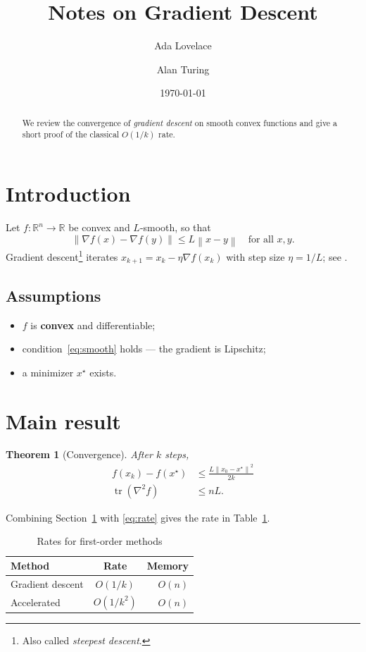 \documentclass[11pt]{article}
\title{Notes on Gradient Descent}
\author{Ada Lovelace \and Alan Turing}
\date{\today}
\newcommand{\R}{\mathbb{R}}
\newcommand{\norm}[1]{\left\lVert #1 \right\rVert}
\DeclareMathOperator{\tr}{tr}
\newtheorem{theorem}{Theorem}
\begin{document}
\maketitle

\begin{abstract}
We review the convergence of \emph{gradient descent} on smooth convex functions and give a
short proof of the classical $O(1/k)$ rate.
\end{abstract}

\section{Introduction}\label{sec:intro}
Let $f \colon \R^n \to \R$ be convex and $L$-smooth, so that
\begin{equation}
  \norm{\nabla f(x) - \nabla f(y)} \le L \norm{x - y} \quad \text{for all } x, y. \label{eq:smooth}
\end{equation}
Gradient descent\footnote{Also called \textit{steepest descent}.} iterates
$x_{k+1} = x_k - \eta \nabla f(x_k)$ with step size $\eta = 1/L$; see \cite{nesterov}.

\subsection{Assumptions}
\begin{itemize}
  \item $f$ is \textbf{convex} and differentiable;
  \item condition~\eqref{eq:smooth} holds --- the gradient is Lipschitz;
  \item a minimizer $x^\star$ exists.
\end{itemize}

\section{Main result}\label{sec:main}
\begin{theorem}[Convergence]
After $k$ steps,
\begin{align}
  f(x_k) - f(x^\star) &\le \frac{L \norm{x_0 - x^\star}^2}{2k} \label{eq:rate} \\
  \tr(\nabla^2 f) &\le nL. \nonumber
\end{align}
\end{theorem}

Combining Section~\ref{sec:intro} with \eqref{eq:rate} gives the rate in Table~\ref{tab:rates}.

\begin{table}[htbp]
  \centering
  \caption{Rates for first-order methods}\label{tab:rates}
  \begin{tabular}{lcr}
    \hline
    Method & Rate & Memory \\
    \hline
    Gradient descent & $O(1/k)$ & $O(n)$ \\
    Accelerated & $O(1/k^2)$ & $O(n)$ \\
    \hline
  \end{tabular}
\end{table}
\end{document}

